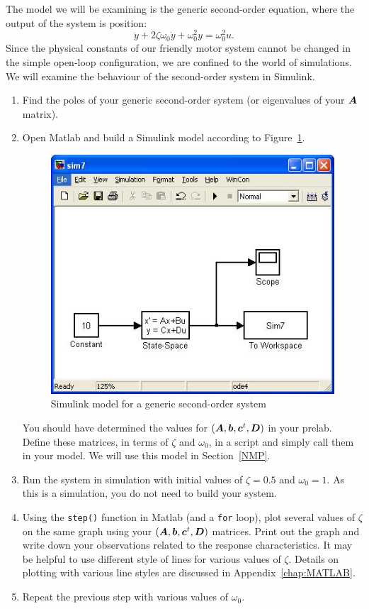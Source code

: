 The model we will be examining is the generic second-order equation, where
the output of the system is position:
\begin{equation}\label{eq:sys}
    \ddot y +2\zeta\omega_{0}\dot y+\omega_{0}^{2}y = \omega_{0}^{2}u.
\end{equation}
Since the physical constants of our friendly motor system cannot be changed
in the simple open-loop configuration, we are confined to the world of
simulations.  We will examine the behaviour of the second-order system in
\textsf{Simulink}.
\begin{enumerate}
    \item Find the poles of your generic second-order system (or eigenvalues of your \(\boldsymbol{A} \) matrix).
    \item Open \textsf{Matlab} and build a \textsf{Simulink} model according to
          Figure~\ref{fig:model7}\@.
          \begin{figure}[htbp]
              \centering
              \includegraphics[width=0.6\hsize]{pix/model7.jpg}
              \caption{\textsf{Simulink} model for a generic second-order system}\label{fig:model7}
          \end{figure}%
          You should have determined the values for
          \((\boldsymbol{A},\boldsymbol{b},\boldsymbol{c}^{t},\boldsymbol{D}) \) in your prelab. Define these matrices, in terms of \(\zeta \) and \(\omega_{0} \), in a script and simply call them in your model. We will use this model in Section~\ref{NMP}.

    \item Run the system in simulation with initial values of \(\zeta=0.5 \) and
          \(\omega_{0}=1\). As this is a simulation, you do not need to build your system.

    \item Using the \verb|step()| function in Matlab (and a \verb|for| loop), plot several values of \(\zeta \) on the same graph using your \((\boldsymbol{A},\boldsymbol{b},\boldsymbol{c}^{t},\boldsymbol{D}) \) matrices.
          Print out the graph and write down your observations related to the response characteristics. It may be helpful to use different style of
          lines for various values of \(\zeta \). Details on plotting with various line
          styles are discussed in Appendix~\ref{chap:MATLAB}\@.

    \item Repeat the previous step with various values of \(\omega_{0}\).
\end{enumerate}

